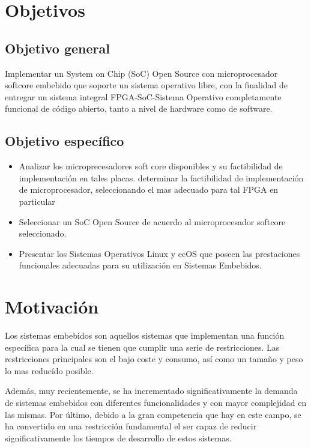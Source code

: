 
\section{Objetivos}
\subsection{Objetivo general}
Implementar un System on Chip (SoC) Open Source con microprocesador softcore embebido que soporte un sistema operativo libre, con la finalidad de
entregar un sistema integral FPGA-SoC-Sistema Operativo completamente funcional de código abierto, tanto a nivel de hardware como de software.

\subsection{Objetivo específico}
\begin{itemize}
\item  Analizar los microprecesadores soft core disponibles y su factibilidad de implementación en tales placas. determinar la factibilidad de implementación de microprocesador, seleccionando el mas adecuado para tal FPGA en particular %
\item Seleccionar un SoC Open Source de acuerdo al microprocesador softcore seleccionado.
\item Presentar los Sistemas Operativos Linux y ecOS que poseen las prestaciones funcionales adecuadas para su utilización en Sistemas
Embebidos.
\end{itemize}
\section{Motivación} 
Los sistemas embebidos son aquellos sistemas que implementan una función específica para la cual se tienen que cumplir una serie de restricciones.
Las restricciones principales son el bajo coste y consumo, así como un tamaño y peso lo mas reducído posible.

Además, muy recientemente, se ha incrementado  significativamente la demanda de sistemas embebidos con diferentes funcionalidades y con mayor
complejidad  en las mismas. Por último, debido a la gran competencia  que hay en este campo, se ha convertido en una restricción fundamental el ser
capaz de reducir significativamente los tiempos de desarrollo de estos sistemas.

